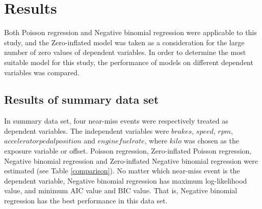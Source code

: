 \documentclass[num-refs]{wiley-article}
\begin{document}
\section{Results}
Both Poisson regression and Negative binomial regression were applicable to this study, and the Zero-inflated model was taken as a consideration for the large number of zero values of dependent variables.
In order to determine the most suitable model for this study, the performance of models on different dependent variables was compared.
\subsection{Results of summary data set}
In summary data set, four near-miss events were respectively treated as dependent variables. The independent variables were $brakes$, $speed$, $rpm$, $acceleratorpedalposition$ and $enginefuelrate$, where $kilo$ was chosen as the exposure variable or offset. Poisson regression, Zero-inflated Poisson regression, Negative binomial regression and Zero-inflated Negative binomial regression were estimated (see Table \ref{comparison}). No matter which near-miss event is the dependent variable, Negative binomial regression has maximum log-likelihood value, and minimum AIC value and BIC value. That is, Negative binomial regression has the best performance in this data set.
\end{document}
